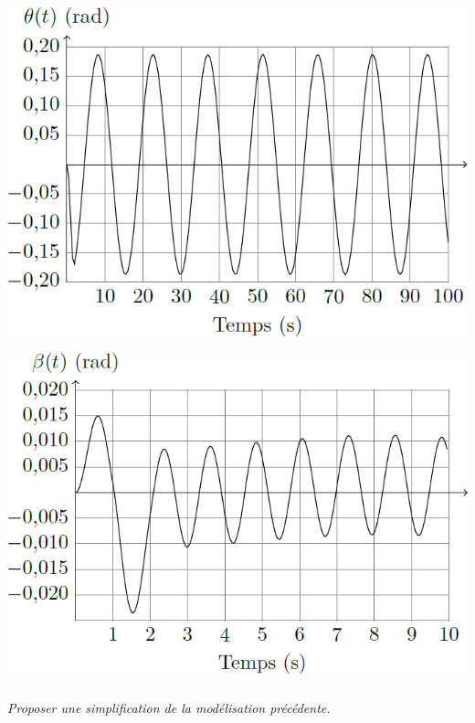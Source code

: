 \documentclass[10pt,fleqn]{article} %
\begin{document}
\begin{multicols}{2}
\begin{center}
\includegraphics[width=.8\linewidth]{images/fig_02}
\end{center}

\begin{center}
\includegraphics[width=.8\linewidth]{images/fig_03}
\end{center}




\subparagraph{}
\textit{Proposer une simplification de la modélisation précédente.   }
\ifprof
\begin{corrige}
\end{corrige}
\else
\fi




\end{multicols}
\end{document}

